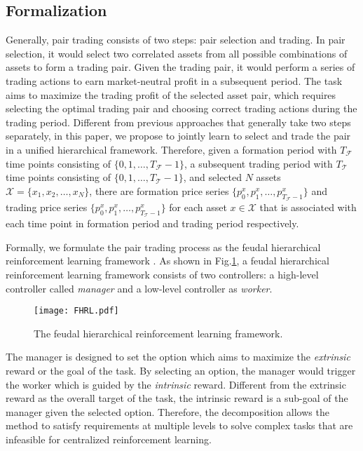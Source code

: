 \documentclass[sigconf]{acmart}
\begin{document}
\subsection{Formalization}
Generally, pair trading consists of two steps: pair selection and trading.
In pair selection, it would select two correlated assets from all possible combinations of assets to form a trading pair.
Given the trading pair, it would perform a series of trading actions to earn market-neutral profit in a subsequent period.
The task aims to maximize the trading profit of the selected asset pair, which requires selecting the optimal trading pair and choosing correct trading actions during the trading period.
Different from previous approaches that generally take two steps separately, in this paper, we propose to jointly learn to select and trade the pair in a unified hierarchical framework.
Therefore, given a formation period with $T_\mathcal{F}$ time points consisting of $\{0,1,\dots,T_\mathcal{F}-1\}$, a subsequent trading period with $T_\mathcal{T}$ time points consisting of $\{0,1,\dots,T_\mathcal{T}-1\}$, and selected $N$ assets $\mathcal{X} = \{x_1, x_2,\dots,x_{N}\}$,
there are formation price series $\{p_0^x, p_1^x,\dots,p_{T_\mathcal{F}-1}^x\}$ and trading price series $\{p_0^x, p_1^x,\dots,p_{T_\mathcal{T}-1}^x\}$ for each asset $x \in \mathcal{X}$ that is associated with each time point in formation period and trading period respectively.

Formally, we formulate the pair trading process as the feudal hierarchical reinforcement learning framework \cite{Pateria2021HierarchicalRL}. As shown in Fig.\ref{fig:fhrl}, a feudal hierarchical reinforcement learning framework consists of two controllers: a high-level controller called \textit{manager} and a low-level controller as \textit{worker}.
\begin{figure}[htb]
 \centering
 \texttt{[image: FHRL.pdf]}
 \caption{The feudal hierarchical reinforcement learning framework.}
 \label{fig:fhrl}
\end{figure}
The manager is designed to set the option which aims to maximize the \textit{extrinsic} reward or the goal of the task. By selecting an option, the manager would trigger the worker which is guided by the \textit{intrinsic} reward. Different from the extrinsic reward as the overall target of the task, the intrinsic reward is a sub-goal of the manager given the selected option. Therefore, the decomposition allows the method to satisfy requirements at multiple levels to solve complex tasks that are infeasible for centralized reinforcement learning.
\end{document}
